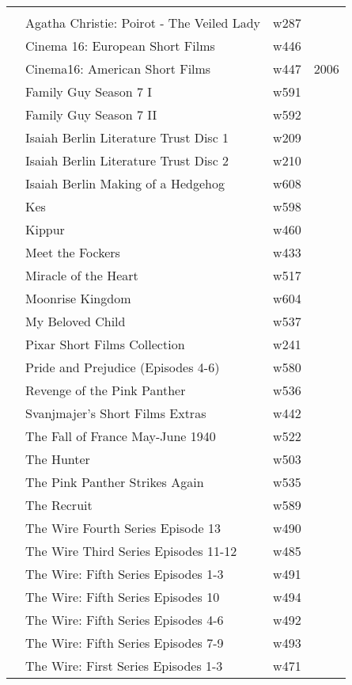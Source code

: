\documentclass{article}
\begin{document}
\begin {center}
\begin{longtable}{l p{10cm} l l}
\hline
\\
 & Agatha Christie: Poirot - The Veiled Lady & w287 &  \\
 & Cinema 16: European Short Films & w446 &  \\
 & Cinema16: American Short Films & w447 & 2006 \\
 & Family Guy Season 7 I & w591 &  \\
 & Family Guy Season 7 II & w592 &  \\
 & Isaiah Berlin Literature Trust Disc 1 & w209 &  \\
 & Isaiah Berlin Literature Trust Disc 2 & w210 &  \\
 & Isaiah Berlin Making of a Hedgehog & w608 &  \\
 & Kes & w598 &  \\
 & Kippur & w460 &  \\
 & Meet the Fockers & w433 &  \\
 & Miracle of the Heart & w517 &  \\
 & Moonrise Kingdom & w604 &  \\
 & My Beloved Child & w537 &  \\
 & Pixar Short Films Collection & w241 &  \\
 & Pride and Prejudice (Episodes 4-6) & w580 &  \\
 & Revenge of the Pink Panther & w536 &  \\
 & Svanjmajer's Short Films Extras & w442 &  \\
 & The Fall of France May-June 1940 & w522 &  \\
 & The Hunter & w503 &  \\
 & The Pink Panther Strikes Again & w535 &  \\
 & The Recruit & w589 &  \\
 & The Wire Fourth Series Episode 13 & w490 &  \\
 & The Wire Third Series Episodes 11-12 & w485 &  \\
 & The Wire: Fifth Series Episodes 1-3 & w491 &  \\
 & The Wire: Fifth Series Episodes 10 & w494 &  \\
 & The Wire: Fifth Series Episodes 4-6 & w492 &  \\
 & The Wire: Fifth Series Episodes 7-9 & w493 &  \\
 & The Wire: First Series Episodes 1-3 & w471 &  \\

\end{longtable}
\end{center}
\end{document}
